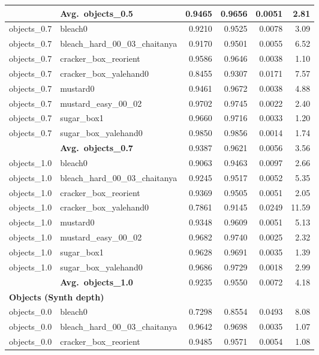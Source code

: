 \begin{longtable}{llrrrr}
  & \textbf{Avg.~objects_0.5} & 0.9465 & 0.9656 & 0.0051 & 2.81 \\
  \midrule
  objects_0.7 & bleach0 & 0.9210 & 0.9525 & 0.0078 & 3.09 \\
  objects_0.7 & bleach\_hard\_00\_03\_chaitanya & 0.9170 & 0.9501 & 0.0055 & 6.52 \\
  objects_0.7 & cracker\_box\_reorient & 0.9586 & 0.9646 & 0.0038 & 1.10 \\
  objects_0.7 & cracker\_box\_yalehand0 & 0.8455 & 0.9307 & 0.0171 & 7.57 \\
  objects_0.7 & mustard0 & 0.9461 & 0.9672 & 0.0038 & 4.88 \\
  objects_0.7 & mustard\_easy\_00\_02 & 0.9702 & 0.9745 & 0.0022 & 2.40 \\
  objects_0.7 & sugar\_box1 & 0.9660 & 0.9716 & 0.0033 & 1.20 \\
  objects_0.7 & sugar\_box\_yalehand0 & 0.9850 & 0.9856 & 0.0014 & 1.74 \\
  \cmidrule{2-6}
  & \textbf{Avg.~objects_0.7} & 0.9387 & 0.9621 & 0.0056 & 3.56 \\
  \midrule
  objects_1.0 & bleach0 & 0.9063 & 0.9463 & 0.0097 & 2.66 \\
  objects_1.0 & bleach\_hard\_00\_03\_chaitanya & 0.9245 & 0.9517 & 0.0052 & 5.35 \\
  objects_1.0 & cracker\_box\_reorient & 0.9369 & 0.9505 & 0.0051 & 2.05 \\
  objects_1.0 & cracker\_box\_yalehand0 & 0.7861 & 0.9145 & 0.0249 & 11.59 \\
  objects_1.0 & mustard0 & 0.9348 & 0.9609 & 0.0051 & 5.13 \\
  objects_1.0 & mustard\_easy\_00\_02 & 0.9682 & 0.9740 & 0.0025 & 2.32 \\
  objects_1.0 & sugar\_box1 & 0.9628 & 0.9691 & 0.0035 & 1.39 \\
  objects_1.0 & sugar\_box\_yalehand0 & 0.9686 & 0.9729 & 0.0018 & 2.99 \\
  \cmidrule{2-6}
  & \textbf{Avg.~objects_1.0} & 0.9235 & 0.9550 & 0.0072 & 4.18 \\
  \midrule
\multicolumn{6}{l}{\textbf{Objects (Synth depth)}} \\
\midrule
  objects_0.0 & bleach0 & 0.7298 & 0.8554 & 0.0493 & 8.08 \\
  objects_0.0 & bleach\_hard\_00\_03\_chaitanya & 0.9642 & 0.9698 & 0.0035 & 1.07 \\
  objects_0.0 & cracker\_box\_reorient & 0.9485 & 0.9571 & 0.0054 & 1.08 \\

\end{longtable}
